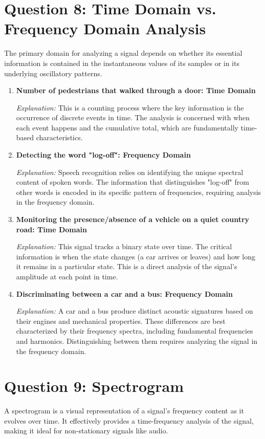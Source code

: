 \documentclass[a4paper,12pt]{article}
\begin{document}
\section{Question 8: Time Domain vs. Frequency Domain Analysis}
The primary domain for analyzing a signal depends on whether its essential information is contained in the instantaneous values of its samples or in its underlying oscillatory patterns.

\begin{enumerate}
    \item \textbf{Number of pedestrians that walked through a door: Time Domain}
    
    \textit{Explanation:} This is a counting process where the key information is the occurrence of discrete events in time. The analysis is concerned with when each event happens and the cumulative total, which are fundamentally time-based characteristics.
    
    \item \textbf{Detecting the word "log-off": Frequency Domain}
    
    \textit{Explanation:} Speech recognition relies on identifying the unique spectral content of spoken words. The information that distinguishes "log-off" from other words is encoded in its specific pattern of frequencies, requiring analysis in the frequency domain.
    
    \item \textbf{Monitoring the presence/absence of a vehicle on a quiet country road: Time Domain}
    
    \textit{Explanation:} This signal tracks a binary state over time. The critical information is when the state changes (a car arrives or leaves) and how long it remains in a particular state. This is a direct analysis of the signal's amplitude at each point in time.
    
    \item \textbf{Discriminating between a car and a bus: Frequency Domain}
    
    \textit{Explanation:} A car and a bus produce distinct acoustic signatures based on their engines and mechanical properties. These differences are best characterized by their frequency spectra, including fundamental frequencies and harmonics. Distinguishing between them requires analyzing the signal in the frequency domain.
\end{enumerate}


\section{Question 9: Spectrogram}
A spectrogram is a visual representation of a signal's frequency content as it evolves over time. It effectively provides a time-frequency analysis of the signal, making it ideal for non-stationary signals like audio.
\end{document}
